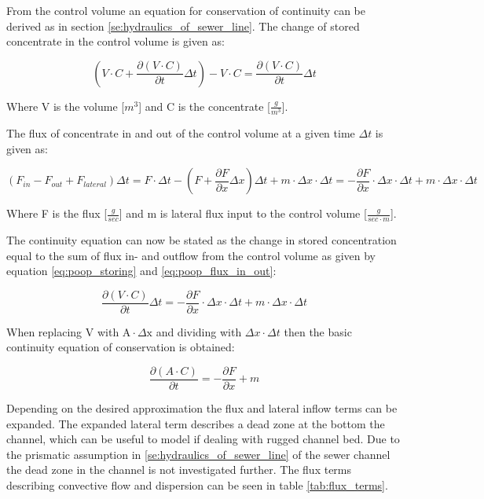 From the control volume an equation for conservation of continuity can be derived as in section \ref{se:hydraulics_of_sewer_line}. The change of stored concentrate in the control volume is given as:

\begin{equation}
 \left(V \cdot C + \frac{\partial (V\cdot C)}{\partial t} \Delta t \right) - V\cdot C = \frac{\partial (V\cdot C)}{\partial t}\Delta t
\label{eq:poop_storing}
\end{equation}

Where V is the volume [$m^3$] and C is the concentrate [$\frac{g}{m^3}$]. 

The flux of concentrate in and out of the control volume at a given time $\Delta t$ is given as:


 \begin{equation}
  	\left( F_{in} - F_{out} + F_{lateral} \right) \Delta t   =	F \cdot \Delta t - \left(F + \frac{\partial F}{\partial x}\Delta x \right) \Delta t + m \cdot \Delta x \cdot \Delta t = - \frac{\partial F}{\partial x}\cdot \Delta x \cdot \Delta t +m \cdot \Delta x \cdot \Delta t  
  \label{eq:poop_flux_in_out}
  \end{equation} 



Where F is the flux [$\frac{g}{sec}$] and m is lateral flux input to the control volume [$\frac{g}{sec\cdot m}$].

The continuity equation can now be stated as the change in stored concentration equal to the sum of flux in- and outflow from the control volume as given by equation \ref{eq:poop_storing} and \ref{eq:poop_flux_in_out}:

\begin{equation}
	\frac{\partial (V\cdot C)}{\partial t}\Delta t = - \frac{\partial F}{\partial x}\cdot \Delta x \cdot \Delta t +m \cdot \Delta x \cdot \Delta t
\end{equation}

When replacing V with $\text{A}\cdot \Delta \text{x}$ and dividing with $\Delta x \cdot  \Delta t$ then the basic continuity equation of conservation is obtained:

\begin{equation}
	\frac{\partial (A\cdot C)}{\partial t} = - \frac{\partial F}{\partial x} + m 
\label{eq:concentrate_continuity_equation}
\end{equation}

Depending on the desired approximation the flux and lateral inflow terms can be expanded. The expanded lateral term describes a dead zone at the bottom the channel, which can be useful to model if dealing with rugged channel bed. Due to the prismatic assumption in \ref{se:hydraulics_of_sewer_line} of the sewer channel the dead zone in the channel is not investigated further. The flux terms describing convective flow and dispersion can be seen in table \ref{tab:flux_terms}.  

